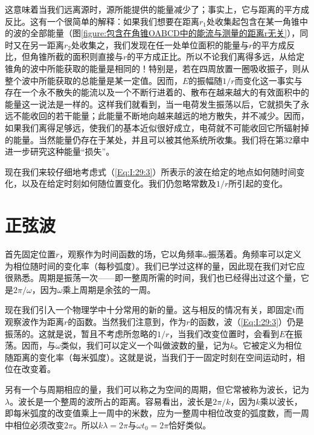 这意味着当我们远离源时，源所能提供的能量减少了；事实上，它与距离的平方成反比。这有一个很简单的解释：如果我们想要在距离$r_1$处收集起包含在某一角锥中的波的全部能量（图\ref{figure:包含在角锥OABCD中的能流与测量的距离r无关}），同时又在另一距离$r_2$处收集之，我们发现在任一处单位面积的能量与$r$的平方成反比，但角锥所截的面积则直接与$r$的平方成正比。所以不论我们离得多远，从给定锥角的波中所能获取的能量是相同的！特别是，若在四周放置一圈吸收振子，则从整个波中所能获取的总能量是某一定值。因而，$E$的振幅随$1/r$而变化这一事实与存在一个永不散失的能流以及一个不断行进着的、散布在越来越大的有效面积中的能量这一说法是一样的。这样我们就看到，当一电荷发生振荡以后，它就损失了永远不能收回的若干能量；此能量不断地向越来越远的地方散失，并不减少。因而，如果我们离得足够远，使我们的基本近似很好成立，电荷就不可能收回它所辐射掉的能量。当然能量仍存在于某处，并且可以被其他系统所收集。我们将在第32章中进一步研究这种能量“损失”。

现在我们来较仔细地考虑式（\ref{Eq:I:29:3}）所表示的波在给定的地点如何随时间变化，以及在给定时刻如何随位置变化。我们仍忽略常数及$1/r$所引起的变化。

\section{正弦波}

首先固定位置$r$，观察作为时间函数的场，它以角频率$\omega$振荡着。角频率可以定义为相位随时间的变化率（每秒弧度）。我们已学过这样的量，因此现在我们对它应很熟悉。周期是振荡一次——即一整周所需的时间，我们也已经得出过这个量，它是$2\pi/\omega$，因为$\omega$乘上周期是余弦的一周。

现在我们引入一个物理学中十分常用的新的量。这与相反的情况有关，即固定t而观察波作为距离$r$的函数。当然我们注意到，作为$r$的函数，波（\ref{Eq:I:29:3}）仍是振荡的。这就是说，暂且不考虑所忽略的$1/r$，当我们改变位置时，会看到$E$在振荡。因而，与$\omega$类似，我们可以定义一个叫做波数的量，记为$k$。它被定义为相位随距离的变化率（每米弧度）。这就是说，当我们于一固定时刻在空间运动时，相位在改变着。

另有一个与周期相应的量，我们可以称之为空间的周期，但它常被称为波长，记为$\lambda$。波长是一个整周的波所占的距离。容易看出，波长是$2\pi/k$，因为$k$乘以波长，即每米弧度的改变值乘上一周中的米数，应为一整周中相位改变的弧度数，而一周中相位必须改变$2\pi$。所以$k\lambda=2\pi$与$\omega t_0=2\pi$恰好类似。

